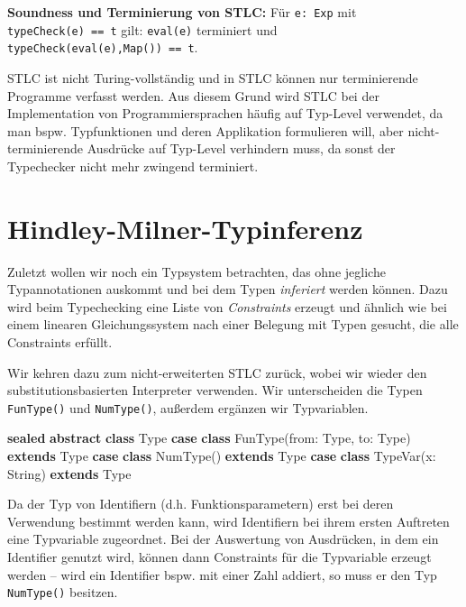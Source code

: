 \documentclass[]{article}
\newenvironment{Shaded}{}{}
\newcommand{\FunctionTok}[1]{\textcolor[rgb]{0.02,0.16,0.49}{#1}}
\newcommand{\KeywordTok}[1]{\textcolor[rgb]{0.00,0.44,0.13}{\textbf{#1}}}
\newcommand{\NormalTok}[1]{#1}
\begin{document}
\textbf{Soundness und Terminierung von STLC:} Für \texttt{e:\ Exp} mit
\texttt{typeCheck(e)\ ==\ t} gilt: \texttt{eval(e)} terminiert und
\texttt{typeCheck(eval(e),Map())\ ==\ t}.

STLC ist nicht Turing-vollständig und in STLC können nur terminierende
Programme verfasst werden. Aus diesem Grund wird STLC bei der
Implementation von Programmiersprachen häufig auf Typ-Level verwendet,
da man bspw. Typfunktionen und deren Applikation formulieren will, aber
nicht-terminierende Ausdrücke auf Typ-Level verhindern muss, da sonst
der Typechecker nicht mehr zwingend terminiert.

\hypertarget{hindley-milner-typinferenz}{%
\section{Hindley-Milner-Typinferenz}\label{hindley-milner-typinferenz}}

Zuletzt wollen wir noch ein Typsystem betrachten, das ohne jegliche
Typannotationen auskommt und bei dem Typen \emph{inferiert} werden
können. Dazu wird beim Typechecking eine Liste von \emph{Constraints}
erzeugt und ähnlich wie bei einem linearen Gleichungssystem nach einer
Belegung mit Typen gesucht, die alle Constraints erfüllt.

Wir kehren dazu zum nicht-erweiterten STLC zurück, wobei wir wieder den
substitutionsbasierten Interpreter verwenden. Wir unterscheiden die
Typen \texttt{FunType()} und \texttt{NumType()}, außerdem ergänzen wir
Typvariablen.

\begin{Shaded}
\begin{Highlighting}[]
\KeywordTok{sealed} \KeywordTok{abstract} \KeywordTok{class}\NormalTok{ Type}
\KeywordTok{case} \KeywordTok{class} \FunctionTok{FunType}\NormalTok{(from: Type, to: Type) }\KeywordTok{extends}\NormalTok{ Type}
\KeywordTok{case} \KeywordTok{class} \FunctionTok{NumType}\NormalTok{() }\KeywordTok{extends}\NormalTok{ Type}
\KeywordTok{case} \KeywordTok{class} \FunctionTok{TypeVar}\NormalTok{(x: String) }\KeywordTok{extends}\NormalTok{ Type}
\end{Highlighting}
\end{Shaded}

Da der Typ von Identifiern (d.h. Funktionsparametern) erst bei deren
Verwendung bestimmt werden kann, wird Identifiern bei ihrem ersten
Auftreten eine Typvariable zugeordnet. Bei der Auswertung von
Ausdrücken, in dem ein Identifier genutzt wird, können dann Constraints
für die Typvariable erzeugt werden -- wird ein Identifier bspw. mit
einer Zahl addiert, so muss er den Typ \texttt{NumType()} besitzen.
\end{document}

